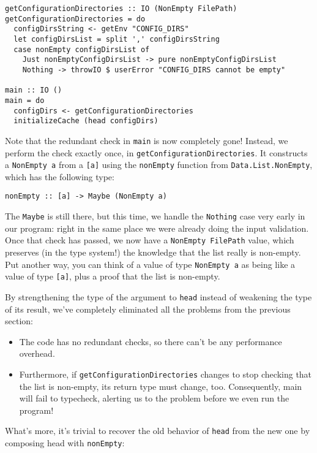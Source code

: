\begin{verbatim}
getConfigurationDirectories :: IO (NonEmpty FilePath)
getConfigurationDirectories = do
  configDirsString <- getEnv "CONFIG_DIRS"
  let configDirsList = split ',' configDirsString
  case nonEmpty configDirsList of
    Just nonEmptyConfigDirsList -> pure nonEmptyConfigDirsList
    Nothing -> throwIO $ userError "CONFIG_DIRS cannot be empty"

main :: IO ()
main = do
  configDirs <- getConfigurationDirectories
  initializeCache (head configDirs)
\end{verbatim}
Note that the redundant check in \texttt{main} is now completely gone! Instead, we perform the check exactly once, in \texttt{getConfigurationDirectories}. It constructs a \texttt{NonEmpty a} from a \texttt{[a]} using the \texttt{nonEmpty} function from \texttt{Data.List.NonEmpty}, which has the following type:

\begin{verbatim}
nonEmpty :: [a] -> Maybe (NonEmpty a)
\end{verbatim}
The \texttt{Maybe} is still there, but this time, we handle the \texttt{Nothing} case very early in our program: right in the same place we were already doing the input validation. Once that check has passed, we now have a \texttt{NonEmpty FilePath} value, which preserves (in the type system!) the knowledge that the list really is non-empty. Put another way, you can think of a value of type \texttt{NonEmpty a} as being like a value of type \texttt{[a]}, plus a proof that the list is non-empty.

By strengthening the type of the argument to \texttt{head} instead of weakening the type of its result, we've completely eliminated all the problems from the previous section:

\begin{itemize}
\item The code has no redundant checks, so there can't be any performance overhead.

\item Furthermore, if \texttt{getConfigurationDirectories} changes to stop checking that the list is non-empty, its return type must change, too. Consequently, main will fail to typecheck, alerting us to the problem before we even run the program!
\end{itemize}
What's more, it's trivial to recover the old behavior of \texttt{head} from the new one by composing head with \texttt{nonEmpty}:


